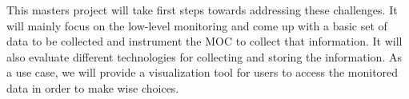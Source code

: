 This masters project will take first steps towards addressing these challenges. It will mainly focus on the low-level monitoring and come up with a basic set of data to be collected and instrument the MOC to collect that information. It will also evaluate different technologies for collecting and storing the information. As a use case, we will provide a visualization tool for users to access the monitored data in order to make wise choices. 